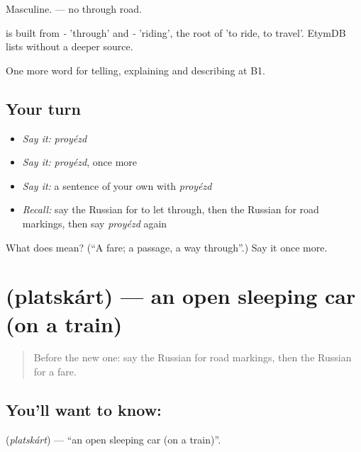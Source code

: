 Masculine. \emph{ } — no through road.

\begin{cousinweb}
\emph{} is built from \emph{-} 'through' and \emph{-} 'riding', the root of \emph{} 'to ride, to travel'. EtymDB lists \emph{} without a deeper source.
\end{cousinweb}

\begin{grammarlens}[title={What you've built}]
One more word for telling, explaining and describing at B1.
\end{grammarlens}

\subsection*{Your turn}
\begin{itemize}
\raggedright
  \item \emph{Say it:} \emph{proyézd}
  \item \emph{Say it:} \emph{proyézd}, once more
  \item \emph{Say it:} a sentence of your own with \emph{proyézd}
  \item \emph{Recall:} say the Russian for to let through, then the Russian for road markings, then say \emph{proyézd} again
\end{itemize}

\begin{tcolorbox}[breakable,colback=teal!4,colframe=teal!35!black,title={Before you move on}]
What does  mean? (\textquotedblleft{}A fare; a passage, a way through\textquotedblright{}.) Say it once more.
\end{tcolorbox}
\section[\texorpdfstring{\ru{плацкарт} (platskárt)}{плацкарт (platskárt)}]{ (platskárt) — an open sleeping car (on a train)}

\label{lesson:RU-C413-platskart}



\begin{quote}
Before the new one: say the Russian for road markings, then the Russian for a fare.
\end{quote}

\subsection*{You'll want to know: }
\textbf{} (\emph{platskárt}) — \textquotedblleft{}an open sleeping car (on a train)\textquotedblright{}.

